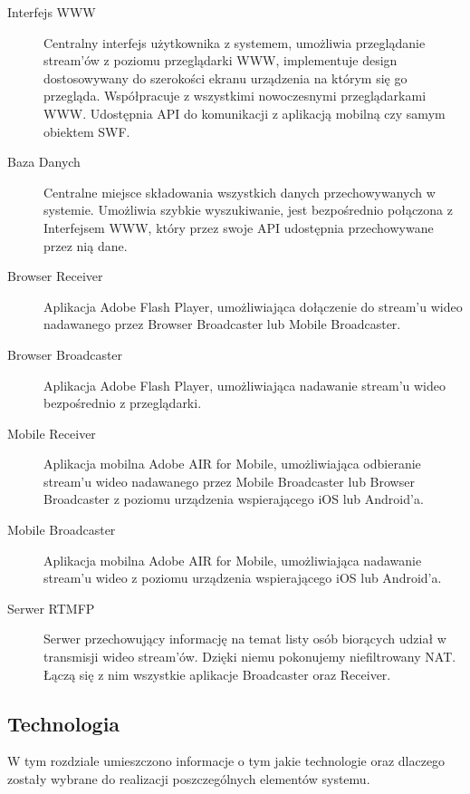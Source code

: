 \begin{minipage}{\textwidth}
    \begin{description}
        \item[Interfejs WWW]{Centralny interfejs użytkownika z systemem, umożliwia przeglądanie stream'ów z poziomu przeglądarki WWW, implementuje design dostosowywany do szerokości ekranu urządzenia na którym się go przegląda. Współpracuje z wszystkimi nowoczesnymi przeglądarkami WWW. Udostępnia API do komunikacji z aplikacją mobilną czy samym obiektem SWF.}
        \item[Baza Danych]{Centralne miejsce składowania wszystkich danych przechowywanych w systemie. Umożliwia szybkie wyszukiwanie, jest bezpośrednio połączona z Interfejsem WWW, który przez swoje API udostępnia przechowywane przez nią dane.}
        \item[Browser Receiver]{Aplikacja Adobe Flash Player, umożliwiająca dołączenie do stream'u wideo nadawanego przez Browser Broadcaster lub Mobile Broadcaster.}
        \item[Browser Broadcaster]{Aplikacja Adobe Flash Player, umożliwiająca nadawanie stream'u wideo bezpośrednio z przeglądarki.}
        \item[Mobile Receiver]{Aplikacja mobilna Adobe AIR for Mobile, umożliwiająca odbieranie stream'u wideo nadawanego przez Mobile Broadcaster lub Browser Broadcaster z poziomu urządzenia wspierającego iOS lub Android'a.}
        \item[Mobile Broadcaster]{Aplikacja mobilna Adobe AIR for Mobile, umożliwiająca nadawanie stream'u wideo z poziomu urządzenia wspierającego iOS lub Android'a.}
        \item[Serwer RTMFP]{Serwer przechowujący informację na temat listy osób biorących udział w transmisji wideo stream'ów. Dzięki niemu pokonujemy niefiltrowany NAT. Łączą się z nim wszystkie aplikacje Broadcaster oraz Receiver.}
    \end{description}
\end{minipage}

\newpage
\subsection{Technologia}
W tym rozdziale umieszczono informacje o tym jakie technologie oraz dlaczego zostały wybrane do realizacji poszczególnych elementów systemu.


